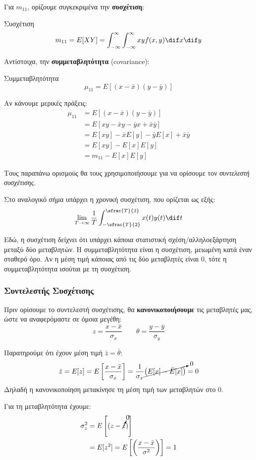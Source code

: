 \documentclass[11pt,a4paper,notitlepage,fleqn,final]{article}
\begin{document}
Για \( m_{11} \), ορίζουμε συγκεκριμένα την \textbf{συσχέτιση}:
\begin{defn}{Συσχέτιση}{}
	\[
	m_{11} = E[XY] = \int_{-\infty}^{\infty} \int_{-\infty}^{\infty}
	xy f(x,y)\dif x \dif y
	\]
\end{defn}

Αντίστοιχα, την \textbf{συμμεταβλητότητα} (covariance):
\begin{defn}{Συμμεταβλητότητα}{}
	\[
	\mu_{11} = E\left[
	(x-\bar x)(y-\bar y)
	\right]
	\]
\end{defn}

Αν κάνουμε μερικές πράξεις:
\begin{align*}
	\mu_{11} &= E\left[(x-\bar x)(y-\bar y)\right] \\
	&= E[xy-\bar x y-\bar y x +\bar x\bar y] \\
	&= E[xy]-\bar xE[y]-\bar y E[x] +\bar x \bar y \\
	&= E[xy] - E[x]E[y] \\
	&= m_{11} - E[x]E[y]
\end{align*}

Τους παραπάνω ορισμούς θα τους χρησιμοποιήσουμε για να ορίσουμε τον
\textit{συντελεστή συσχέτισης}.

Στο αναλογικό σήμα υπάρχει η χρονική συσχέτιση, που ορίζεται ως εξής:
\[
\lim_{T\to \infty} \frac{1}{T} \int_{-\sfrac{T}{2} }^{\sfrac{T}{2} }
x(t)y(t)\dif t
\]

Εδώ, η συσχέτιση δείχνει ότι υπάρχει κάποια στατιστική
σχέση/αλληλοεξάρτηση μεταξύ δύο μεταβλητών. Η συμμεταβλητότητα είναι
η συσχέτιση, μειωμένη κατά έναν σταθερό όρο. Αν η μέση τιμή κάποιας
από τις δύο μεταβλητές είναι 0, τότε η συμμεταβλητότητα ισούται με τη
συσχέτιση.

\subsubsection{Συντελεστής Συσχέτισης}

Πριν ορίσουμε το συντελεστή συσχέτισης, θα \textbf{κανονικοποιήσουμε}
τις μεταβλητές μας, ώστε να αναφερόμαστε σε όμοια μεγέθη:
\[
z=\frac{x-\bar x}{\sigma_x}
\qquad \theta = \frac{y-\bar y}{\sigma_y}
\]

Παρατηρούμε ότι έχουν μέση τιμή \( \bar z=\bar \theta \):
\[
\bar z = E[z]=E\left[\frac{x-\bar x}{\sigma_x}\right]
= \frac{1}{\sigma_x}\cancelto{0}{\left(E[x]-\bar E[x]\right)} = 0
\]
Δηλαδή η κανονικοποίηση μετακίνησε τη μέση τιμή των μεταβλητών στο 0.

Για τη μεταβλητότητα έχουμε:
\begin{align*}
\sigma_z^2 &= E\left[(z-\cancelto{0}{\bar z})\right]
\\ &= E[z^2] = E\left[\left(\frac{x-\bar x}{\sigma^2}\right)\right]
= 1
\end{align*}
\end{document}
